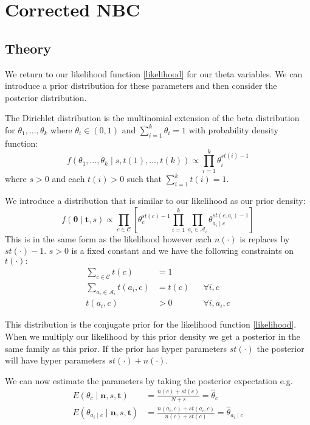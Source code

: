 \chapter{Corrected NBC}

\section{Theory}

We return to our likelihood function \cref{likelihood} for our theta variables.
We can introduce a prior distribution for these parameters and then consider the posterior distribution.

The Dirichlet distribution is the multinomial extension of the beta distribution for $\theta_1,\dots,\theta_k$ where $\theta_i \in (0,1)$ and $\sum_{i=1}^k \theta_i = 1$ with probability density function:
\begin{equation} \label{dirichlet_pdf}
	f(\theta_1,\dots,\theta_k \mid s, t(1),\dots,t(k)) \propto \prod_{i=1}^k \theta_i^{st(i) - 1}
\end{equation}
where $s > 0$ and each $t(i)>0$ such that $\sum_{i=1}^{k}t(i) = 1$.

We introduce a distribution that is similar to our likelihood as our prior density:
\begin{equation} \label{prior}
	f(\mathbf{\theta} \mid \mathbf{t}, s) \propto \prod_{c \in \mathcal{C}} \left[ \theta_c^{st(c) - 1} \prod_{i=1}^k \prod_{a_i \in \mathcal{A}_i} \theta_{a_i \mid c}^{st(c, a_i) - 1} \right]
\end{equation}
This is in the same form as the likelihood however each $n(\cdot)$ is replaces by $st(\cdot) - 1$.
$s > 0$ is a fixed constant and we have the following constraints on $t(\cdot):$
\begin{align}\label{prior_constraints}
	\sum_{c \in \mathcal{C}} t(c) & = 1 \\
	\sum_{a_i \in \mathcal{A}_i} t(a_i, c) & = t(c) && \forall i, c \\
	t(a_i, c) & > 0 && \forall i, a_i, c
\end{align}

This distribution is the conjugate prior for the likelihood function \cref{likelihood}.
When we multiply our likelihood by this prior density we get a posterior in the same family as this prior.
If the prior has hyper parameters $st(\cdot)$ the posterior will have hyper parameters $st(\cdot) + n(\cdot)$.

We can now estimate the parameters by taking the posterior expectation e.g.
\begin{align}
	E(\theta_c \mid \mathbf{n},s,\mathbf{t}) & = \frac{n(c) + st(c)}{N + s} = \hat{\theta}_c \\
	E(\theta_{a_i \mid c} \mid \mathbf{n},s,\mathbf{t}) & = \frac{n(a_i, c) + st(a_i, c)}{n(c) + st(c)} = \hat{\theta}_{a_i \mid c}
\end{align}


